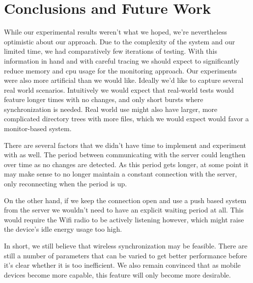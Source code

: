 \section{Conclusions and Future Work}
\label{sec:Conclusions and Future Work}

While our experimental results weren't what we hoped, we're nevertheless optimistic about our approach.  Due to the complexity of the system and our limited time, we had comparatively few iterations of testing.  With this information in hand and with careful tracing we should expect to significantly reduce memory and cpu usage for the monitoring approach.  Our experiments were also more artificial than we would like.  Ideally we'd like to capture several real world scenarios.  Intuitively we would expect that real-world tests would feature longer times with no changes, and only short bursts where synchronization is needed. Real world use might also have larger, more complicated directory trees with more files, which we would expect would favor a monitor-based system.

There are several factors that we didn't have time to implement and experiment with as well.  The period between communicating with the server could lengthen over time as no changes are detected. As this period gets longer, at some point it may make sense to no longer maintain a constant connection with the server, only reconnecting when the period is up.  

On the other hand, if we keep the connection open and use a push based system from the server we wouldn't need to have an explicit waiting period at all. This would require the Wifi radio to be actively listening however, which might raise the device's idle energy usage too high.

In short, we still believe that wireless synchronization may be feasible. There are still a number of parameters that can be varied to get better performance before it's clear whether it is too inefficient. We also remain convinced that as mobile devices become more capable, this feature will only become more desirable.
